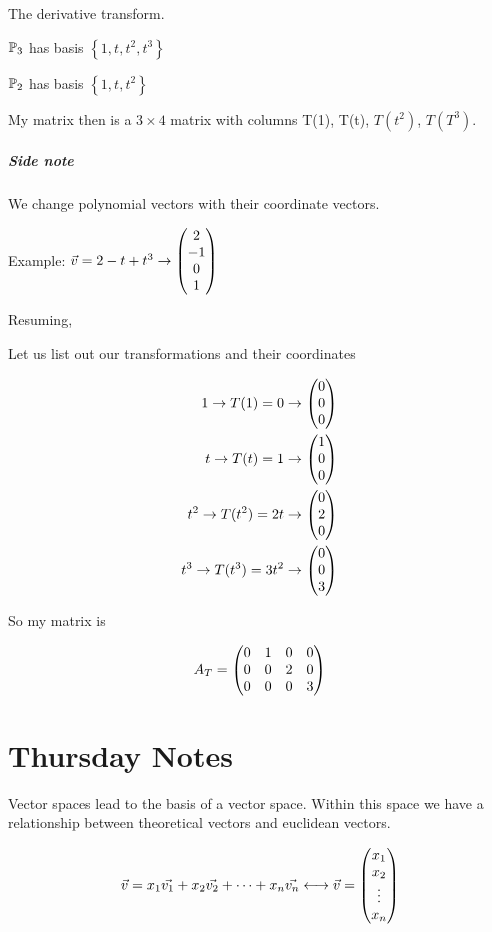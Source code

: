 \documentclass[a4paper]{article}
\begin{document}
The derivative transform.

$\P_3$ has basis $\left\{ 1, t, t^2, t^3 \right\}$

$\P_2$ has basis $\left\{ 1, t, t^2 \right\}$

My matrix then is a $3 \times 4$ matrix with columns T(1), T(t), $T(t^2)$, $T(T^3)$.

\subsubsection{Side note}
We change polynomial vectors with their coordinate vectors.

Example: $\vec{v} = 2 - t + t^3 \to \genericmat{p}{2 \\ -1 \\ 0 \\ 1}$

Resuming,

Let us list out our transformations and their coordinates

\[
	\begin{aligned}
		1 \to T(1) = 0 \to \genericmat{p}{0\\0\\0} \\
		t \to T(t) = 1 \to \genericmat{p}{1\\0\\0} \\
		t^2 \to T(t^2) = 2t \to \genericmat{p}{0\\2\\0} \\
		t^3 \to T(t^3) = 3t^2 \to \genericmat{p}{0\\0\\3} \\
	\end{aligned}
\]

So my matrix is 

\[A_T = \genericmat{p}{0&1&0&0 \\ 0&0&2&0 \\ 0&0&0&3}\]

\part{Thursday Notes}

Vector spaces lead to the basis of a vector space. Within this space we have a relationship between theoretical vectors and euclidean vectors.

\[
	\vec{v} = x_1 \vec{v_1} + x_2 \vec{v_2} + \dots + x_n \vec{v_n} 
	\longleftrightarrow
	\vec{v} = \genericmat{p}{x_1\\x_2\\ \vdots \\ x_n}
\]
\end{document}
